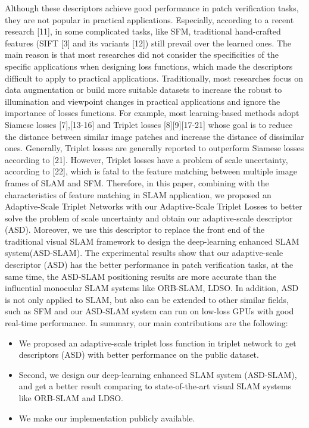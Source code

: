 \documentclass[letterpaper, 10 pt, conference]{ieeeconf}  %
\begin{document}
Although these descriptors achieve good performance in patch verification tasks, they are not popular in practical applications. Especially, according to a recent research [11], in some complicated tasks, like SFM, traditional hand-crafted features (SIFT [3] and its variants [12]) still prevail over the learned ones. The main reason is that most researches did not consider the specificities of the specific applications when designing loss functions, which made the descriptors difficult to apply to practical applications. Traditionally, most researches focus on data augmentation or build more suitable datasets to increase the robust to illumination and viewpoint changes in practical applications and ignore the importance of losses functions. For example, most learning-based methods adopt Siamese losses [7],[13-16] and Triplet losses [8][9][17-21] whose goal is to reduce the distance between similar image patches and increase the distance of dissimilar ones. Generally, Triplet losses are generally reported to outperform Siamese losses according to [21]. However, Triplet losses have a problem of scale uncertainty, according to [22], which is fatal to the feature matching between multiple image frames of SLAM and SFM. Therefore, in this paper, combining with the characteristics of feature matching in SLAM application, we proposed an Adaptive-Scale Triplet Networks with our Adaptive-Scale Triplet Losses to better solve the problem of scale uncertainty and obtain our adaptive-scale descriptor (ASD). Moreover, we use this descriptor to replace the front end of the traditional visual SLAM framework to design the deep-learning enhanced SLAM system(ASD-SLAM). The experimental results show that our adaptive-scale descriptor (ASD) has the better performance in patch verification tasks, at the same time, the ASD-SLAM positioning results are more accurate than the influential monocular SLAM systems like ORB-SLAM, LDSO. In addition, ASD is not only applied to SLAM, but also can be extended to other similar fields, such as SFM and our ASD-SLAM system can run on low-loss GPUs with good real-time performance. In summary, our main contributions are the following:
\begin{itemize}
\item We proposed an adaptive-scale triplet loss function in triplet network to get descriptors (ASD) with better performance on the public dataset.
\item Second, we design our deep-learning enhanced SLAM system (ASD-SLAM), and get a better result comparing to state-of-the-art visual SLAM systems like ORB-SLAM and LDSO.
\item We make our implementation publicly available.
\end{itemize}
\end{document}
